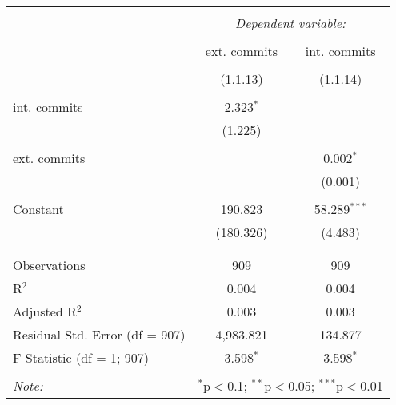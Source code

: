 
\begin{tabular}{@{\extracolsep{5pt}}lcc}
\\[-1.8ex]\hline
\hline \\[-1.8ex]
 & \multicolumn{2}{c}{\textit{Dependent variable:}} \\
\cline{2-3}
\\[-1.8ex] & ext. commits & int. commits \\
\\[-1.8ex] & (1.1.13) & (1.1.14)\\ 
\hline \\[-1.8ex]
 int. commits & 2.323$^{*}$ &  \\
  & (1.225) &  \\
  & & \\
 ext. commits &  & 0.002$^{*}$ \\
  &  & (0.001) \\
  & & \\
 Constant & 190.823 & 58.289$^{***}$ \\
  & (180.326) & (4.483) \\
  & & \\
\hline \\[-1.8ex]
Observations & 909 & 909 \\
R$^{2}$ & 0.004 & 0.004 \\
Adjusted R$^{2}$ & 0.003 & 0.003 \\
Residual Std. Error (df = 907) & 4,983.821 & 134.877 \\
F Statistic (df = 1; 907) & 3.598$^{*}$ & 3.598$^{*}$ \\
\hline
\hline \\[-1.8ex]
\textit{Note:}  & \multicolumn{2}{r}{$^{*}$p$<$0.1; $^{**}$p$<$0.05; $^{***}$p$<$0.01} \\
\end{tabular}
